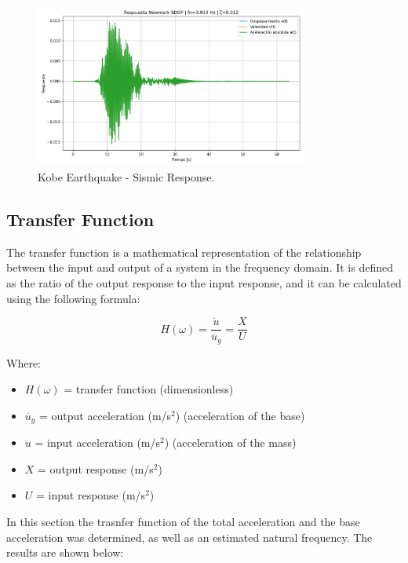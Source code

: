 \documentclass{article}  %
\begin{document}
\begin{figure}[H]
  \centering
  \includegraphics[width=0.8\textwidth]{GRAFICOS/respnewmark_Kobe.png}
  \caption{Kobe Earthquake - Sismic Response.}
  \label{fig:kobe}
\end{figure}

\subsection{Transfer Function}

The transfer function is a mathematical representation of the relationship between the input and output of a system in the frequency domain. It is defined as the ratio of the output response to the input response, and it can be calculated using the following formula:

\begin{equation}
  H(\omega) = \frac{\ddot{u}}{\ddot{u_g}} = \frac{X}{U}
\end{equation}

Where:
\begin{itemize}
  \item $H(\omega)$ = transfer function (dimensionless)
  \item $\ddot{u_g}$ = output acceleration (m/s$^2$) (acceleration of the base) 
  \item $\ddot{u}$ = input acceleration (m/s$^2$) (acceleration of the mass)
  \item $X$ = output response (m/s$^2$)
  \item $U$ = input response (m/s$^2$)
\end{itemize}

In this section the trasnfer function of the total acceleration and the base acceleration was determined, as well as an estimated natural frequency. The results are shown below:
\end{document}
